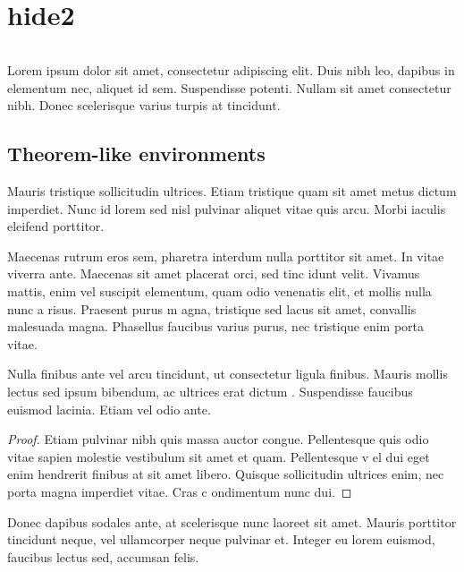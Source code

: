 \iffalse
\chapter{hide2}

\begin{lstlisting}[language={C++},caption={},label={}]

\end{lstlisting}


Lorem ipsum dolor sit amet, consectetur adipiscing elit. Duis nibh leo, dapibus in elementum nec, aliquet id sem. Suspendisse potenti.
 Nullam sit amet consectetur nibh. Donec scelerisque varius turpis at tincidunt.

\section{Theorem-like environments}

\begin{definition}
Mauris tristique sollicitudin ultrices. Etiam tristique quam sit amet metus dictum imperdiet. Nunc id lorem sed nisl pulvinar aliquet 
vitae quis arcu. Morbi iaculis eleifend porttitor.
\end{definition}

Maecenas rutrum eros sem, pharetra interdum nulla porttitor sit amet. In vitae viverra ante. Maecenas sit amet placerat orci, sed tinc
idunt velit. Vivamus mattis, enim vel suscipit elementum, quam odio venenatis elit, et mollis nulla nunc a risus. Praesent purus m
agna, tristique sed lacus sit amet, convallis malesuada magna. Phasellus faucibus varius purus, nec tristique enim porta vitae.

\begin{theorem}
Nulla finibus ante vel arcu tincidunt, ut consectetur ligula finibus. Mauris mollis lectus sed ipsum bibendum, ac ultrices erat dictum
. Suspendisse faucibus euismod lacinia. Etiam vel odio ante.
\end{theorem}
\begin{proof}
Etiam pulvinar nibh quis massa auctor congue. Pellentesque quis odio vitae sapien molestie vestibulum sit amet et quam. Pellentesque v
el dui eget enim hendrerit finibus at sit amet libero. Quisque sollicitudin ultrices enim, nec porta magna imperdiet vitae. Cras c
ondimentum nunc dui.
\end{proof}

Donec dapibus sodales ante, at scelerisque nunc laoreet sit amet. Mauris porttitor tincidunt neque, vel ullamcorper neque pulvinar et.
 Integer eu lorem euismod, faucibus lectus sed, accumsan felis. 

